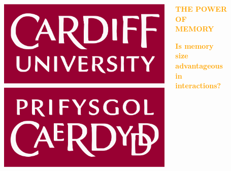 \documentclass[usenames,dvipsnames,t]{beamer}
\begin{document}
\begin{columns}
    \begin{column}{.02\linewidth}
    \end{column}
    \begin{column}{.1\linewidth}
        \vspace{1cm}

        \begin{center}
        \includegraphics[width=.7\textwidth]{static/cardiff_uni_logo}
        \end{center}
    \end{column}
    \begin{column}{.7\linewidth}
    \vspace{1.5cm}

    \centering
    \textbf{\textcolor{orange}{\fontsize{110}{120} \selectfont THE POWER OF MEMORY}}
    \vspace{0.7cm}

    \textbf{\Large\textcolor{orange}{Is memory size advantageous in interactions?}}
    \end{column}
    \begin{column}{.2\linewidth}
        
        \begin{center}
            
        \end{center}
        \end{column}

    \begin{column}{.02\linewidth}
    \end{column}
\end{columns}
\vspace{1cm}
\end{document}
